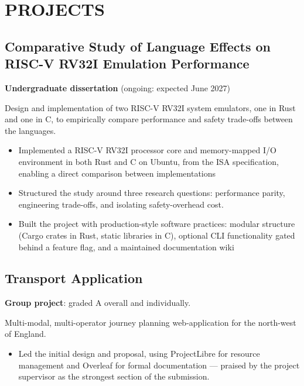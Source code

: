 \section{PROJECTS}

\subsection{Comparative Study of Language Effects on RISC-V RV32I Emulation Performance}
\begin{subs}
    \noindent\textbf{Undergraduate dissertation} (ongoing: expected June 2027) \par
    \noindent Design and implementation of two RISC-V RV32I system emulators, one in Rust and one in C, to empirically compare performance and safety trade-offs between the languages.
    \begin{itemize}
        \item Implemented a RISC-V RV32I processor core and memory-mapped I/O environment in both Rust and C on Ubuntu, from the ISA specification, enabling a direct comparison between implementations
        \item Structured the study around three research questions: performance parity, engineering trade-offs, and isolating safety-overhead cost.
        \item Built the project with production-style software practices: modular structure (Cargo crates in Rust, static libraries in C), optional CLI functionality gated behind a feature flag, and a maintained documentation wiki
    \end{itemize}
\end{subs}

\subsection{Transport Application}
\begin{subs}
    \noindent\textbf{Group project}: graded A overall and individually. \par
    \noindent Multi-modal, multi-operator journey planning web-application for the north-west of England. \par
    \begin{itemize}
        \item Led the initial design and proposal, using ProjectLibre for resource management and Overleaf for formal documentation — praised by the project supervisor as the strongest section of the submission.
    \end{itemize}
\end{subs}
